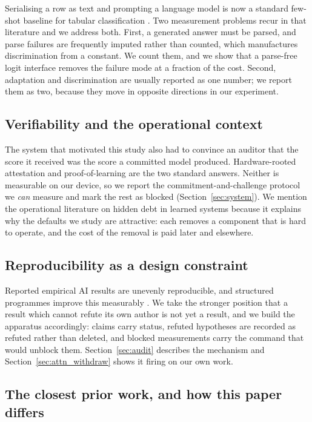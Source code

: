 Serialising a row as text and prompting a language model is now a standard
few-shot baseline for tabular classification \cite{hegselmann2023tabllm}. Two
measurement problems recur in that literature and we address both. First, a
generated answer must be parsed, and parse failures are frequently imputed
rather than counted, which manufactures discrimination from a constant. We count
them, and we show that a parse-free logit interface removes the failure mode at a
fraction of the cost. Second, adaptation and discrimination are usually reported
as one number; we report them as two, because they move in opposite directions in
our experiment.

\subsection{Verifiability and the operational context}

The system that motivated this study also had to convince an auditor that the
score it received was the score a committed model produced. Hardware-rooted
attestation \cite{costan2016sgx} and proof-of-learning
\cite{jia2021proof} are the two standard answers. Neither is measurable on our
device, so we report the commitment-and-challenge protocol we \emph{can} measure
and mark the rest as blocked (Section~\ref{sec:system}). We mention the
operational literature on hidden debt in learned systems \cite{sculley2015hidden}
because it explains why the defaults we study are attractive: each removes a
component that is hard to operate, and the cost of the removal is paid later and
elsewhere.

\subsection{Reproducibility as a design constraint}

Reported empirical AI results are unevenly reproducible, and structured
programmes improve this measurably \cite{pineau2021improving}. We take the
stronger position that a result which cannot refute its own author is not yet a
result, and we build the apparatus accordingly: claims carry status, refuted
hypotheses are recorded as refuted rather than deleted, and blocked measurements
carry the command that would unblock them. Section~\ref{sec:audit} describes the
mechanism and Section~\ref{sec:attn_withdraw} shows it firing on our own work.

\subsection{The closest prior work, and how this paper differs}

